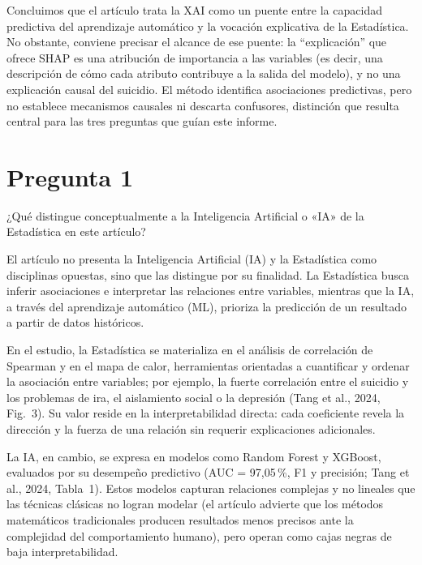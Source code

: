 \documentclass[11pt]{article}
\begin{document}
Concluimos que el artículo trata la XAI como un puente entre la capacidad predictiva del aprendizaje automático y la vocación explicativa de la Estadística. No obstante, conviene precisar el alcance de ese puente: la ``explicación'' que ofrece SHAP es una atribución de importancia a las variables (es decir, una descripción de cómo cada atributo contribuye a la salida del modelo), y no una explicación causal del suicidio. El método identifica asociaciones predictivas, pero no establece mecanismos causales ni descarta confusores, distinción que resulta central para las tres preguntas que guían este informe.

\clearpage

\section*{Pregunta 1}
¿Qué distingue conceptualmente a la Inteligencia Artificial o «IA» de la Estadística en este artículo?

\medskip

El artículo no presenta la Inteligencia Artificial (IA) y la Estadística como disciplinas opuestas, sino que las distingue por su finalidad. La Estadística busca inferir asociaciones e interpretar las relaciones entre variables, mientras que la IA, a través del aprendizaje automático (ML), prioriza la predicción de un resultado a partir de datos históricos.

En el estudio, la Estadística se materializa en el análisis de correlación de Spearman y en el mapa de calor, herramientas orientadas a cuantificar y ordenar la asociación entre variables; por ejemplo, la fuerte correlación entre el suicidio y los problemas de ira, el aislamiento social o la depresión (Tang et al., 2024, Fig.~3). Su valor reside en la interpretabilidad directa: cada coeficiente revela la dirección y la fuerza de una relación sin requerir explicaciones adicionales.

La IA, en cambio, se expresa en modelos como Random Forest y XGBoost, evaluados por su desempeño predictivo (AUC = 97,05\,\%, F1 y precisión; Tang et al., 2024, Tabla~1). Estos modelos capturan relaciones complejas y no lineales que las técnicas clásicas no logran modelar (el artículo advierte que los métodos matemáticos tradicionales producen resultados menos precisos ante la complejidad del comportamiento humano), pero operan como cajas negras de baja interpretabilidad.
\end{document}
